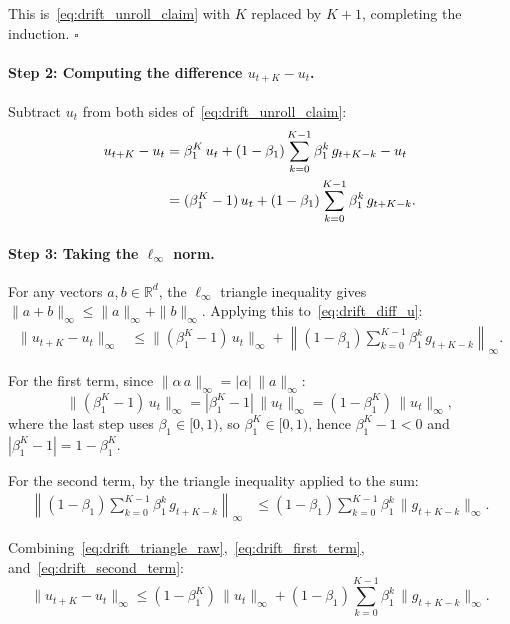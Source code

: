 \documentclass{article}
\begin{document}
This is~\eqref{eq:drift_unroll_claim} with $K$ replaced by $K+1$,
completing the induction. \hfill$\square$

\paragraph{Step 2: Computing the difference $u_{t+K} - u_t$.}

Subtract $u_t$ from both sides of~\eqref{eq:drift_unroll_claim}:
\begin{align}
u_{t+K} - u_t
&= \beta_1^K\,u_t + (1-\beta_1)\sum_{k=0}^{K-1}\beta_1^k\,g_{t+K-k}
   - u_t \notag \\
&= (\beta_1^K - 1)\,u_t
   + (1-\beta_1)\sum_{k=0}^{K-1}\beta_1^k\,g_{t+K-k}.
\label{eq:drift_diff_u}
\end{align}

\paragraph{Step 3: Taking the $\ell_\infty$ norm.}

For any vectors $a, b \in \mathbb{R}^d$, the $\ell_\infty$ triangle
inequality gives $\|a + b\|_\infty \leq \|a\|_\infty + \|b\|_\infty$.
Applying this to~\eqref{eq:drift_diff_u}:
\begin{align}
\|u_{t+K} - u_t\|_\infty
&\leq \|(\beta_1^K - 1)\,u_t\|_\infty
   + \left\|(1-\beta_1)\sum_{k=0}^{K-1}\beta_1^k\,g_{t+K-k}\right\|_\infty.
\label{eq:drift_triangle_raw}
\end{align}

For the first term, since $\|\alpha\,a\|_\infty = |\alpha|\,\|a\|_\infty$:
\begin{equation}
\|(\beta_1^K - 1)\,u_t\|_\infty
= |\beta_1^K - 1|\,\|u_t\|_\infty
= (1 - \beta_1^K)\,\|u_t\|_\infty,
\label{eq:drift_first_term}
\end{equation}
where the last step uses $\beta_1 \in [0,1)$, so $\beta_1^K \in [0,1)$,
hence $\beta_1^K - 1 < 0$ and $|\beta_1^K - 1| = 1 - \beta_1^K$.

For the second term, by the triangle inequality applied to the sum:
\begin{align}
\left\|(1-\beta_1)\sum_{k=0}^{K-1}\beta_1^k\,g_{t+K-k}\right\|_\infty
&\leq (1-\beta_1)\sum_{k=0}^{K-1}\beta_1^k\,\|g_{t+K-k}\|_\infty.
\label{eq:drift_second_term}
\end{align}

Combining~\eqref{eq:drift_triangle_raw},~\eqref{eq:drift_first_term},
and~\eqref{eq:drift_second_term}:
\begin{equation}
\|u_{t+K} - u_t\|_\infty
\leq (1-\beta_1^K)\,\|u_t\|_\infty
+ (1-\beta_1)\sum_{k=0}^{K-1}\beta_1^k\,\|g_{t+K-k}\|_\infty.
\label{eq:drift_triangle_combined}
\end{equation}
\end{document}
